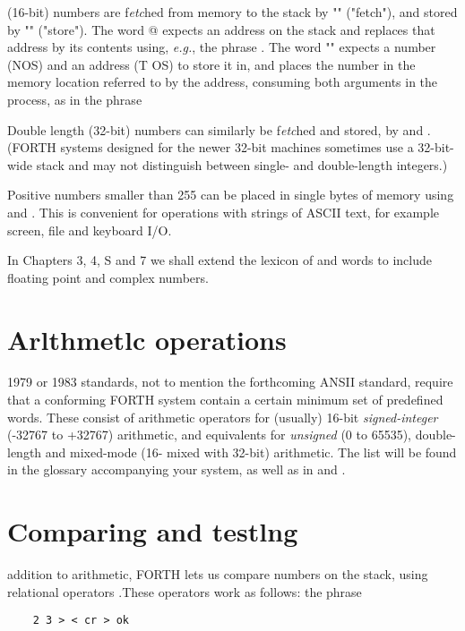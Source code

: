  (16-bit) numbers are f\textit{etc}hed from memory to the stack by "" ("fetch"), and stored by "\bc{!}" ("store"). The word @ expects an address on the stack and replaces that address by its contents using, \textit{e.g.}, the phrase . The word "\regc{!}" expects a number (NOS) and an address (T OS) to store it in, and places the number in the memory location referred to by the address, consuming both arguments in the process, as in the phrase 

Double length (32-bit) numbers can similarly be f\textit{etc}hed and stored, by  and  . (FORTH systems designed for the newer 32-bit machines sometimes use a 32-bit-wide stack and may not distinguish between single- and double-length integers.)

Positive numbers smaller than 255 can be placed in single bytes of memory using  and . This is convenient for operations with strings of ASCII text, for example screen, file and keyboard I/O.

In Chapters 3, 4, S and 7 we shall extend the lexicon of  and \regc{!} words to include floating point and complex numbers.

\section{Arlthmetlc operations}

 1979 or 1983 standards, not to mention the forthcoming ANSII standard, require that a conforming FORTH system contain a certain minimum set of predefined words. These consist of arithmetic operators  for (usually) 16-bit \textit{signed-integer} (-32767 to +32767) arithmetic, and equivalents for \textit{unsigned} (0 to 65535), double-length and mixed-mode (16- mixed with 32-bit) arithmetic. The list will be found in the glossary accompanying your system, as well as in \SF and \FTR.

\section{Comparing and testlng}

 addition to arithmetic, FORTH lets us compare numbers on the stack, using relational operators \bc{> < =}.These operators work as follows: the phrase

\begin{lstlisting}
    2 3 > < cr > ok
\end{lstlisting}

